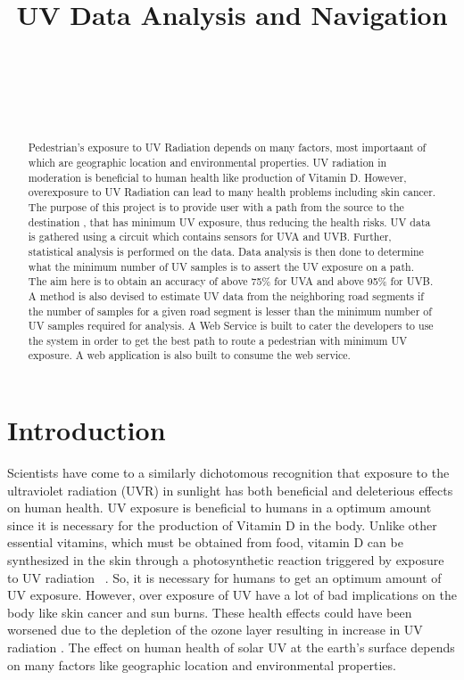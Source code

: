 \documentclass[10pt]{sigplan-proc-varsize}
\author{
%
\alignauthor{Aditya Modi, Jerrid Matthews, Mario Gerla } \\
        \affaddr{Department of Computer Science}\\
        \affaddr{University of California, Los Angeles}\\
        \affaddr{Los Angeles. CA 90024}\\
       \email{\{adityam, matth122, gerla\}@cs.ucla.edu}
}
\title{\textbf{ UV Data Analysis and Navigation}}
\begin{document}
\maketitle
\begin{abstract}
Pedestrian’s exposure to UV Radiation depends on many factors, most importaant of which are geographic location and environmental properties. UV radiation in moderation is beneficial to human health like production of Vitamin D. However, overexposure to UV Radiation can lead to many health problems including skin cancer. The purpose of this project is to provide user with a path from the source to the destination , that has minimum UV exposure, thus reducing the health risks. UV data is gathered using a circuit which contains sensors for UVA and UVB. Further, statistical analysis is performed on the data. Data analysis is then done to determine what the minimum number of UV samples is to assert the UV exposure on a path. The aim here is to obtain an accuracy of above 75\% for UVA and above 95\% for UVB. A method is also devised to estimate UV data from the neighboring road segments if the number of samples for a given road segment is lesser than the minimum number of UV samples required for analysis. A Web Service is built to cater the developers to use the system in order to get the best path to route a pedestrian with minimum UV exposure. A web application is also built to consume the web service.\\
\end{abstract}


\section{Introduction}
Scientists have come to a similarly dichotomous recognition that exposure to the ultraviolet radiation (UVR) in sunlight has both beneficial and deleterious effects on human health. UV exposure is beneficial to humans in a optimum amount since it is necessary for the production of Vitamin D in the body. Unlike other essential vitamins, which must be obtained from food, vitamin D can be synthesized in the skin through a photosynthetic reaction triggered by exposure to UV radiation ~\cite{dep1}. So, it is necessary for humans to get an optimum amount of UV exposure. However, over exposure of UV have a lot of bad implications on the body like skin cancer and sun burns. These health effects could have been worsened due to the depletion of the ozone layer resulting in increase in UV radiation \cite{dep2}. The effect on human health of solar UV at the earth’s surface depends on many factors like geographic location and environmental properties.  
\end{document}
